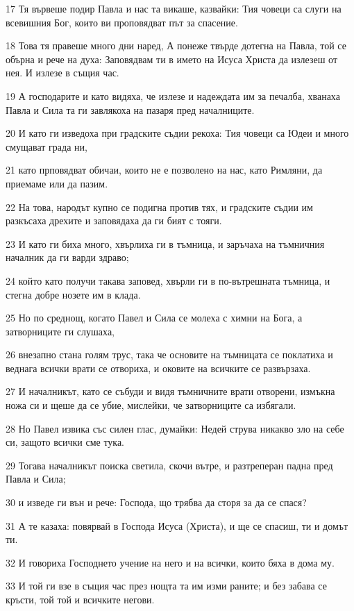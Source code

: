 \par 17 Тя вървеше подир Павла и нас та викаше, казвайки: Тия човеци са слуги на всевишния Бог, които ви проповядват път за спасение.
\par 18 Това тя правеше много дни наред, А понеже твърде дотегна на Павла, той се обърна и рече на духа: Заповядвам ти в името на Исуса Христа да излезеш от нея. И излезе в същия час.
\par 19 А господарите и като видяха, че излезе и надеждата им за печалба, хванаха Павла и Сила та ги завлякоха на пазаря пред началниците.
\par 20 И като ги изведоха при градските съдии рекоха: Тия човеци са Юдеи и много смущават града ни,
\par 21 като прповядват обичаи, които не е позволено на нас, като Римляни, да приемаме или да пазим.
\par 22 На това, народът купно се подигна против тях, и градските съдии им разкъсаха дрехите и заповядаха да ги бият с тояги.
\par 23 И като ги биха много, хвърлиха ги в тъмница, и заръчаха на тъмничния началник да ги варди здраво;
\par 24 който като получи такава заповед, хвърли ги в по-вътрешната тъмница, и стегна добре нозете им в клада.
\par 25 Но по среднощ, когато Павел и Сила се молеха с химни на Бога, а затворниците ги слушаха,
\par 26 внезапно стана голям трус, така че основите на тъмницата се поклатиха и веднага всички врати се отвориха, и оковите на всичките се развързаха.
\par 27 И началникът, като се събуди и видя тъмничните врати отворени, измъкна ножа си и щеше да се убие, мислейки, че затворниците са избягали.
\par 28 Но Павел извика със силен глас, думайки: Недей струва никакво зло на себе си, защото всички сме тука.
\par 29 Тогава началникът поиска светила, скочи вътре, и разтреперан падна пред Павла и Сила;
\par 30 и изведе ги вън и рече: Господа, що трябва да сторя за да се спася?
\par 31 А те казаха: повярвай в Господа Исуса (Христа), и ще се спасиш, ти и домът ти.
\par 32 И говориха Господнето учение на него и на всички, които бяха в дома му.
\par 33 И той ги взе в същия час през нощта та им изми раните; и без забава се кръсти, той той и всичките негови.
